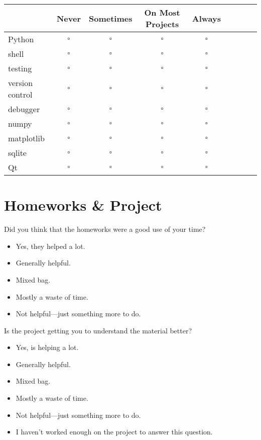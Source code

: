 \documentclass[article,twoside]{memoir}
\newcommand*{\checkbox}{$\square$}
\def\th#1{#1}
\begin{document}
\begin{tabular}[H]{lcccccccc}

\toprule
    & \th{Never} & \th{Sometimes} & \th{On Most Projects} & \th{Always}\\
\midrule
Python             &\checkbox &\checkbox &\checkbox &\checkbox \\
shell              &\checkbox &\checkbox &\checkbox &\checkbox \\
testing            &\checkbox &\checkbox &\checkbox &\checkbox \\
version control    &\checkbox &\checkbox &\checkbox &\checkbox \\
debugger           &\checkbox &\checkbox &\checkbox &\checkbox \\
numpy              &\checkbox &\checkbox &\checkbox &\checkbox \\
matplotlib         &\checkbox &\checkbox &\checkbox &\checkbox \\
sqlite             &\checkbox &\checkbox &\checkbox &\checkbox \\
Qt                 &\checkbox &\checkbox &\checkbox &\checkbox \\
\bottomrule
\end{tabular}

\chapter{Homeworks \& Project}

Did you think that the homeworks were a good use of your time?
\begin{itemize}[\checkbox]
\item Yes, they helped a lot.
\item Generally helpful.
\item Mixed bag.
\item Mostly a waste of time.
\item Not helpful---just something more to do.
\end{itemize}

Is the project getting you to understand the material better?
\begin{itemize}[\checkbox]
\item Yes, is helping a lot.
\item Generally helpful.
\item Mixed bag.
\item Mostly a waste of time.
\item Not helpful---just something more to do.
\item I haven't worked enough on the project to answer this question.
\end{itemize}
\end{document}
